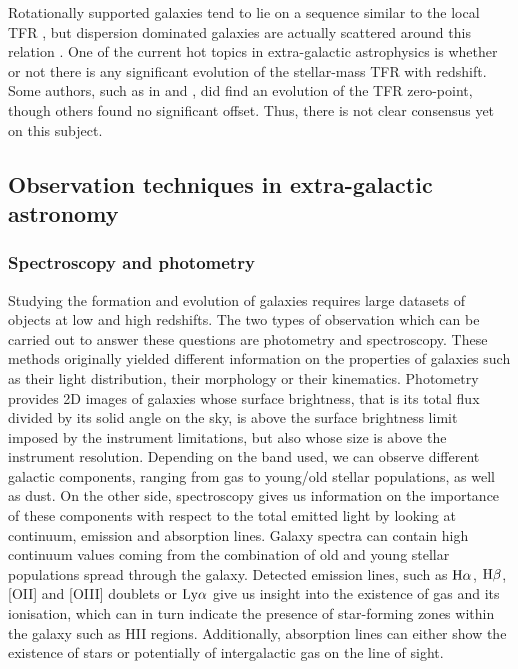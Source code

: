 Rotationally supported galaxies tend to lie on a sequence similar to the local TFR , but dispersion dominated galaxies are actually scattered around this relation . One of the current hot topics in extra-galactic astrophysics is whether or not there is any significant evolution of the stellar-mass TFR with redshift. Some authors, such as in and , did find an evolution of the TFR zero-point, though others found no significant offset. Thus, there is not clear consensus yet on this subject. 


\newpage
\subsection{Observation techniques in extra-galactic astronomy}
\label{subsec:diffPhotSpec}

\subsubsection{Spectroscopy and photometry}
\label{subsubsec:photo_data}

Studying the formation and evolution of galaxies requires large datasets of objects at low and high redshifts. The two types of observation which can be carried out to answer these questions are photometry and spectroscopy. These methods originally yielded different information on the properties of galaxies such as their light distribution, their morphology or their kinematics. Photometry provides 2D images of galaxies whose surface brightness, that is its total flux divided by its solid angle on the sky, is above the surface brightness limit imposed by the instrument limitations, but also whose size is above the instrument resolution. Depending on the band used, we can observe different galactic components, ranging from gas to young/old stellar populations, as well as dust. On the other side, spectroscopy gives us information on the importance of these components with respect to the total emitted light by looking at continuum, emission and absorption lines. Galaxy spectra can contain high continuum values coming from the combination of old and young stellar populations spread through the galaxy. Detected emission lines, such as $\rm{H}{\alpha}$, $\rm{H}{\beta}$, [OII] and [OIII] doublets or $\rm{Ly}\alpha$ give us insight into the existence of gas and its ionisation, which can in turn indicate the presence of star-forming zones within the galaxy such as HII regions. Additionally, absorption lines can either show the existence of stars or potentially of intergalactic gas on the line of sight. \\
      

